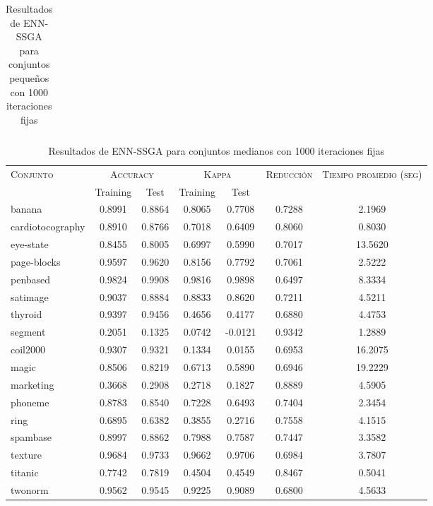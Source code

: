 \begin{table}[]
\begin{tabular}{l c c c c c c}
\hline
\end{tabular}
\caption{Resultados de ENN-SSGA para conjuntos pequeños con 1000 iteraciones fijas}
\label{res-peq-enn-ssga}
\end{table}


\begin{table}[]
\centering
\begin{tabular}{l c c c c c c}
\hline
\multirow{2}{*}{\textsc{Conjunto}}
	& \multicolumn{2}{c}{\textsc{Accuracy}}
	& \multicolumn{2}{c}{\textsc{Kappa}}
	& \textsc{Reducción}
	& \textsc{Tiempo promedio (seg)} \\
	& Training & Test
	& Training & Test \\ 
\hline
\hline

banana & 0.8991 & 0.8864 & 0.8065 & 0.7708 & 0.7288 & 2.1969 \\
cardiotocography & 0.8910 & 0.8766 & 0.7018 & 0.6409 & 0.8060 & 0.8030 \\
eye-state & 0.8455 & 0.8005 & 0.6997 & 0.5990 & 0.7017 & 13.5620 \\
page-blocks & 0.9597 & 0.9620 & 0.8156 & 0.7792 & 0.7061 & 2.5222 \\
penbased & 0.9824 & 0.9908 & 0.9816 & 0.9898 & 0.6497 & 8.3334 \\
satimage & 0.9037 & 0.8884 & 0.8833 & 0.8620 & 0.7211 & 4.5211 \\
thyroid & 0.9397 & 0.9456 & 0.4656 & 0.4177 & 0.6880 & 4.4753 \\
segment & 0.2051 & 0.1325 & 0.0742 & -0.0121 & 0.9342 & 1.2889 \\
coil2000 & 0.9307 & 0.9321 & 0.1334 & 0.0155 & 0.6953 & 16.2075 \\
magic & 0.8506 & 0.8219 & 0.6713 & 0.5890 & 0.6946 & 19.2229 \\
marketing & 0.3668 & 0.2908 & 0.2718 & 0.1827 & 0.8889 & 4.5905 \\
phoneme & 0.8783 & 0.8540 & 0.7228 & 0.6493 & 0.7404 & 2.3454 \\
ring & 0.6895 & 0.6382 & 0.3855 & 0.2716 & 0.7558 & 4.1515 \\
spambase & 0.8997 & 0.8862 & 0.7988 & 0.7587 & 0.7447 & 3.3582 \\
texture & 0.9684 & 0.9733 & 0.9662 & 0.9706 & 0.6984 & 3.7807 \\
titanic & 0.7742 & 0.7819 & 0.4504 & 0.4549 & 0.8467 & 0.5041 \\
twonorm & 0.9562 & 0.9545 & 0.9225 & 0.9089 & 0.6800 & 4.5633 \\

\hline
\end{tabular}
\caption{Resultados de ENN-SSGA para conjuntos medianos con 1000 iteraciones fijas}
\label{res-med-enn-ssga}
\end{table}


